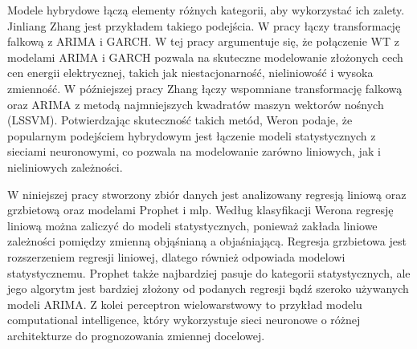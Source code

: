 Modele hybrydowe łączą elementy różnych kategorii, aby wykorzystać ich zalety. Jinliang Zhang jest przykładem takiego podejścia. W pracy \cite{TAN20103606} łączy transformację falkową z ARIMA i GARCH. W tej pracy argumentuje się, że połączenie WT z modelami ARIMA i GARCH pozwala na skuteczne modelowanie złożonych cech cen energii elektrycznej, takich jak niestacjonarność, nieliniowość i wysoka zmienność. W późniejszej pracy Zhang \cite{ZHANG2012695} łączy wspomniane transformację falkową oraz ARIMA z metodą najmniejszych kwadratów maszyn wektorów nośnych (LSSVM). Potwierdzając skuteczność takich metód, Weron \cite{WERON20141030} podaje, że popularnym podejściem hybrydowym jest łączenie modeli statystycznych z sieciami neuronowymi, co pozwala na modelowanie zarówno liniowych, jak i nieliniowych zależności.

W niniejszej pracy stworzony zbiór danych jest analizowany regresją liniową oraz grzbietową oraz modelami Prophet i \gls{mlp}. Według klasyfikacji Werona regresję liniową można zaliczyć do modeli statystycznych, ponieważ zakłada liniowe zależności pomiędzy zmienną objąśnianą a objaśniającą. Regresja grzbietowa jest rozszerzeniem regresji liniowej, dlatego również odpowiada modelowi statystycznemu. Prophet także najbardziej pasuje do kategorii statystycznych, ale jego algorytm jest bardziej złożony od podanych regresji bądź szeroko używanych modeli ARIMA. Z kolei perceptron wielowarstwowy to przykład modelu computational intelligence, który wykorzystuje sieci neuronowe o różnej architekturze do prognozowania zmiennej docelowej.
